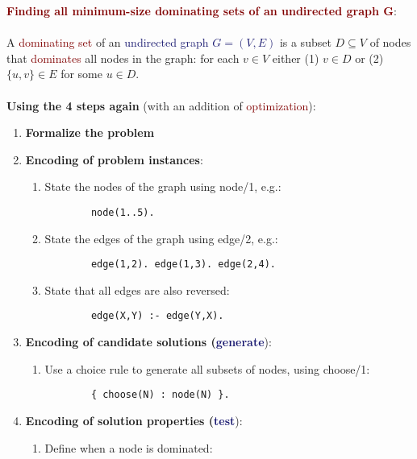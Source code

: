 \newpage

{\Large \textbf{\textcolor{Maroon}{Finding all minimum-size dominating sets of an undirected graph G}}}: \\
\\
A \textcolor{Maroon}{dominating set} of an \textcolor{MidnightBlue}{undirected graph $G = (V,E)$} is a subset $D \subseteq V$ of nodes that \textcolor{Maroon}{dominates} all nodes in the graph: for each $v \in V$ either (1) $v \in D$ or (2) $\{u,v\} \in E$ for some $u \in D$. \\
\\
\textbf{Using the 4 steps again} (with an addition of \textcolor{Maroon}{optimization}): 
\begin{enumerate}
    \item \textbf{Formalize the problem}
    \item \textbf{Encoding of problem instances}:
    \begin{enumerate}
        \item State the nodes of the graph using node/1, e.g.:
        \begin{lstlisting}
        node(1..5).
        \end{lstlisting}
        \item State the edges of the graph using edge/2, e.g.:
        \begin{lstlisting}
        edge(1,2). edge(1,3). edge(2,4).
        \end{lstlisting}
        \item State that all edges are also reversed:
        \begin{lstlisting}
        edge(X,Y) :- edge(Y,X).
        \end{lstlisting}
    \end{enumerate}
    \item \textbf{Encoding of candidate solutions (\textcolor{MidnightBlue}{generate}}):
    \begin{enumerate}
        \item Use a choice rule to generate all subsets of nodes, using choose/1:
        \begin{lstlisting}
        { choose(N) : node(N) }.
        \end{lstlisting}
    \end{enumerate}
    \item \textbf{Encoding of solution properties (\textcolor{MidnightBlue}{test}}):
    \begin{enumerate}
        \item Define when a node is \textcolor{PineGreen}{dominated}:

\end{enumerate}
\end{enumerate}
